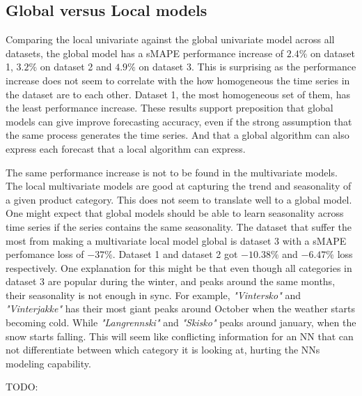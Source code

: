 

\subsection{Global versus Local models}
Comparing the local univariate against the global univariate model across all datasets,
the global model has a sMAPE performance increase of $2.4\%$ on dataset 1, $3.2\%$ on dataset 2 and
$4.9\%$ on dataset 3. This is surprising as the performance increase does not seem to correlate
with the how homogeneous the time series in the dataset are to each other.
Dataset 1, the most homogeneous set of them, has the least performance increase.
These results support \cite{Montero-Manso2021} preposition that global models can give
improve forecasting accuracy, even if the strong assumption that the same process generates the time series.
And that a global algorithm can also express each forecast that a local algorithm can express.

The same performance increase is not to be found in the multivariate models.
The local multivariate models are good at capturing the trend and seasonality of
a given product category. This does not seem to translate well to a global model.
One might expect that global models should be able to learn seasonality across
time series if the series contains the same seasonality.
The dataset that suffer the most from making a multivariate local model global is dataset 3
with a sMAPE perfomance loss of $-37\%$. Dataset 1 and dataset 2 got $-10.38\%$ and $-6.47\%$ loss
respectively.
One explanation for this might be that even though all categories in dataset 3 are popular during the
winter, and peaks around the same months, their seasonality is not enough in sync.
For example, \textit{"Vintersko"} and \textit{"Vinterjakke"} has their most giant peaks around October
when the weather starts becoming cold. While \textit{"Langrennski"} and \textit{"Skisko"}
peaks around january, when the snow starts falling.
This will seem like conflicting information for an NN that can not differentiate between
which category it is looking at, hurting the NNs modeling capability.

TODO:
%

